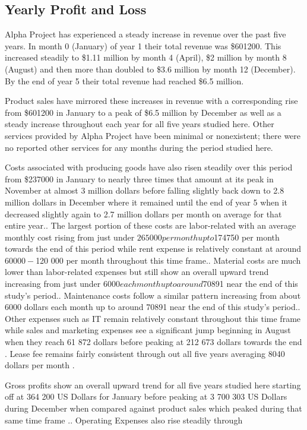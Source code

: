 

\subsection{Yearly Profit and Loss}\label{sec:title}

Alpha Project has experienced a steady increase in revenue over the past five years. In month 0 (January) of year 1 their total revenue was \$601200. This increased steadily to \$1.11 million by month 4 (April), \$2 million by month 8 (August) and then more than doubled to \$3.6 million by month 12 (December). By the end of year 5 their total revenue had reached \$6.5 million. 

Product sales have mirrored these increases in revenue with a corresponding rise from \$601200 in January to a peak of \$6.5 million by December as well as a steady increase throughout each year for all five years studied here. Other services provided by Alpha Project have been minimal or nonexistent; there were no reported other services for any months during the period studied here. 

Costs associated with producing goods have also risen steadily over this period from \$237000 in January to nearly three times that amount at its peak in November at almost 3 million dollars before falling slightly back down to 2.8 million dollars in December where it remained until the end of year 5 when it decreased slightly again to 2.7 million dollars per month on average for that entire year.. The largest portion of these costs are labor-related with an average monthly cost rising from just under $265000 per month up to $174750 per month towards the end of this period while rent expense is relatively constant at around $60 000-$120 000 per month throughout this time frame.. Material costs are much lower than labor-related expenses but still show an overall upward trend increasing from just under $6000 each month up to around $70891 near the end of this study's period.. Maintenance costs follow a similar pattern increasing from about 6000 dollars each month up to around 70891 near the end of this study's period.. Other expenses such as IT remain relatively constant throughout this time frame while sales and marketing expenses see a significant jump beginning in August when they reach 61 872 dollars before peaking at 212 673 dollars towards the end  . Lease fee remains fairly consistent through out all five years averaging 8040 dollars per month . 

 Gross profits show an overall upward trend for all five years studied here starting off at 364 200 US Dollars for January before peaking at 3 700 303 US Dollars during December when compared against product sales which peaked during that same time frame .. Operating Expenses also rise steadily through